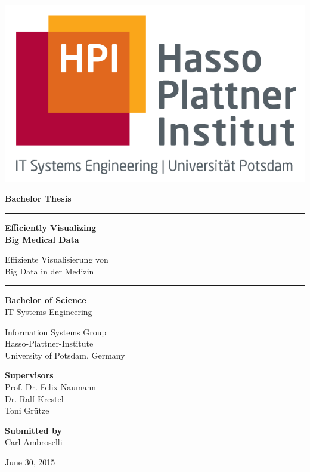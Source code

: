 \begin{titlepage}
  \begin{center} 	
	
		\includegraphics[scale=.3]{images/HPI.png}
		
		\vspace{1cm}
		
		{\Large\bfseries Bachelor Thesis \par}
		
		\vspace{0.5cm}
    
		\rule{\textwidth}{0.4pt}
    {\LARGE\bfseries Efficiently Visualizing \\Big Medical Data \par}
    \vspace{0.5cm}
                
    {\large\bfseries{Effiziente Visualisierung von \\Big Data in der Medizin\par}}
		\rule{\textwidth}{0.4pt}

        
    \vspace{1cm}

    {\large\bfseries{Bachelor of Science}}\\
    IT-Systems Engineering
    \vspace{0.3cm}
    
    Information Systems Group\\
    Hasso-Plattner-Institute\\
    University of Potsdam, Germany
    
    \vspace{1.3cm}
   	
		\textbf{Supervisors}\\ 
		Prof. Dr. Felix Naumann\\
		Dr. Ralf Krestel\\
                Toni Grütze
 
                \vspace{0.8cm}

		\textbf{Submitted by}\\   
	        Carl Ambroselli	
			
    \vspace{0.8cm}
		
    June 30, 2015
  \end{center}
\end{titlepage}

